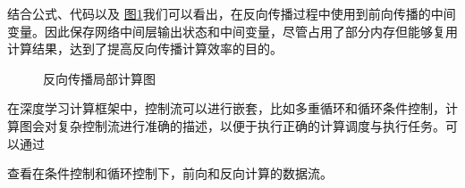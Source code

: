 \documentclass[letterpaper,10pt,english]{sphinxmanual}
\let\sphinxpxdimen\pdfpxdimen\else\newdimen\sphinxpxdimen
\begin{document}
\begin{sphinxVerbatim}[commandchars=\\\{\}]
   
   
   
   
   
   
\end{sphinxVerbatim}

\sphinxAtStartPar
结合公式、代码以及
\hyperref[\detokenize{chapter_computational_graph/components_of_computational_graph:chain}]{图\ref{\detokenize{chapter_computational_graph/components_of_computational_graph:chain}}}我们可以看出，在反向传播过程中使用到前向传播的中间变量。因此保存网络中间层输出状态和中间变量，尽管占用了部分内存但能够复用计算结果，达到了提高反向传播计算效率的目的。

\begin{figure}[H]
\centering
\capstart

\noindent\sphinxincludegraphics[width=600\sphinxpxdimen]{{chain}.svg}
\caption{反向传播局部计算图}\label{\detokenize{chapter_computational_graph/components_of_computational_graph:id15}}\label{\detokenize{chapter_computational_graph/components_of_computational_graph:chain}}\end{figure}

\sphinxAtStartPar
在深度学习计算框架中，控制流可以进行嵌套，比如多重循环和循环条件控制，计算图会对复杂控制流进行准确的描述，以便于执行正确的计算调度与执行任务。可以通过%
\begin{footnote}[5]\sphinxAtStartFootnote
{}
%
\end{footnote}查看在条件控制和循环控制下，前向和反向计算的数据流。
\end{document}
